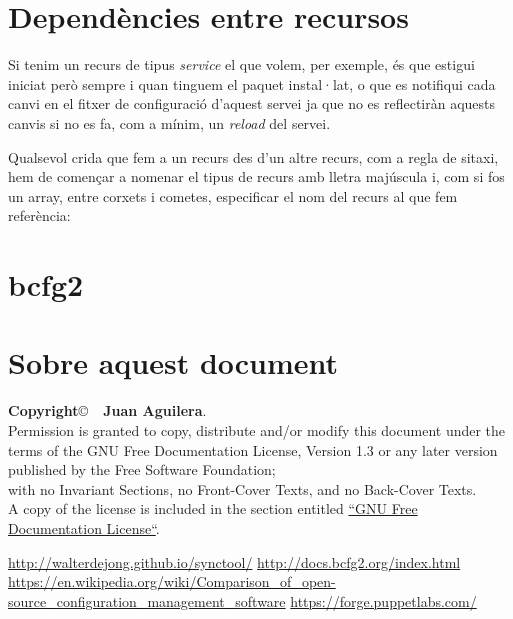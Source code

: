 \documentclass[a4paper]{article}
\begin{document}
\section{Dependències entre recursos}
Si tenim un recurs de tipus \textit{service} el que volem, per exemple, \'es que estigui iniciat però sempre i quan tinguem el paquet instal·lat, o que es notifiqui cada canvi en el fitxer de configuració d'aquest servei ja que no es reflectiràn aquests canvis si no es fa, com a mínim, un \textit{reload} del servei.

Qualsevol crida que fem a un recurs des d'un altre recurs, com a regla de sitaxi, hem de començar a nomenar el tipus de recurs amb lletra majúscula i, com si fos un array, entre corxets i cometes, especificar el nom del recurs al que fem referència:

\section{bcfg2}\cite{BCFG2}

\section{Sobre aquest document}
\textbf{Copyright}\copyright\ \textbf{\the\year\ Juan Aguilera}.\\
Permission is granted to copy, distribute and/or modify this document under the terms of the GNU Free Documentation License, Version 1.3 or any later version published by the Free Software Foundation;\\
with no Invariant Sections, no Front-Cover Texts, and no Back-Cover Texts.\\
A copy of the license is included in the section entitled \href{http://www.gnu.org/licenses/fdl.html}{``GNU Free Documentation License``}.

\begin{thebibliography}{99}
	 \url{http://walterdejong.github.io/synctool/}
	 \url{http://docs.bcfg2.org/index.html}
	 \url{https://en.wikipedia.org/wiki/Comparison_of_open-source_configuration_management_software}
	 \url{https://forge.puppetlabs.com/} 
\end{thebibliography}
\end{document}

